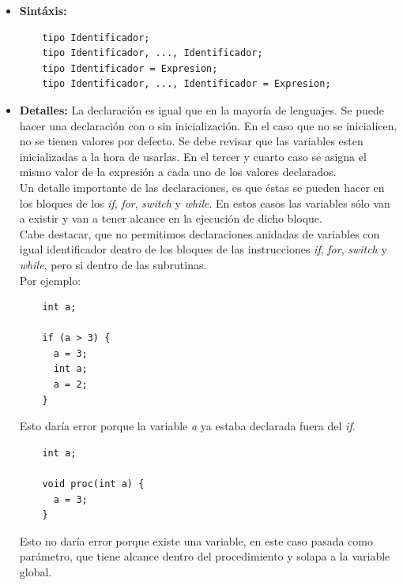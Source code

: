 \documentclass[11pt, spanish]{report}
\begin{document}
\begin{itemize}
\item \textbf{Sint\'axis:}

  \begin{verbatim} 
    tipo Identificador;
    tipo Identificador, ..., Identificador;
    tipo Identificador = Expresion;
    tipo Identificador, ..., Identificador = Expresion;
  \end{verbatim} 

\item \textbf{Detalles:}
  La declaraci\'on es igual que en la mayor\'ia de lenguajes. Se puede hacer una declaraci\'on con o sin inicializaci\'on. En el caso que no se inicialicen, no se tienen valores por defecto. Se debe revisar que las variables esten inicializadas a la hora de usarlas. En el tercer y cuarto caso se 
  asigna el mismo valor de la expresi\'on a cada uno de los valores declarados.\\
  
  Un detalle importante de las declaraciones, es que \'estas se pueden hacer en los bloques de los \emph{if}, \emph{for}, \emph{switch} y \emph{while}. 
  En estos casos las variables s\'olo van a existir y van a tener alcance en la ejecuci\'on de dicho bloque. \\
  
  Cabe destacar, que no permitimos declaraciones anidadas de variables con igual identificador dentro de los bloques de las instrucciones \emph{if}, 
  \emph{for}, \emph{switch} y \emph{while}, pero si dentro de las subrutinas.\\
  
  Por ejemplo:
  
  \begin{verbatim} 
    int a;
    
    if (a > 3) {
      a = 3;
      int a;
      a = 2;
    }
  \end{verbatim} 

  Esto dar\'ia error porque la variable \emph{a} ya estaba declarada fuera del \emph{if}.

  \begin{verbatim}
    int a;
    
    void proc(int a) {
      a = 3;
    }
  \end{verbatim}

  Esto no dar\'ia error porque existe una variable, en este caso pasada como par\'ametro, que tiene alcance dentro del procedimiento y solapa a la variable
  global.\\


\end{itemize}
\end{document}
